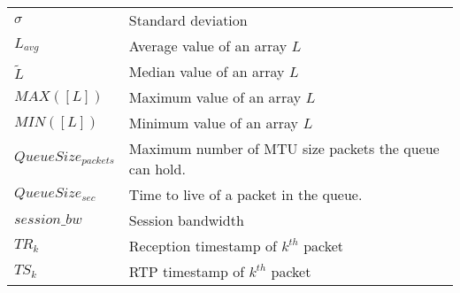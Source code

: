 \begin{longtable}{ll}
$\sigma$	& 	Standard deviation \\
$L_{avg}$   & Average value of an array $L$ \\
$\widetilde{L}$ & Median value of an array $L$ \\
$MAX([L])$ 	& Maximum value of an array $L$ \\
$MIN([L])$ 	& Minimum value of an array $L$ \\
$QueueSize_{packets}$ & Maximum number of MTU size packets the queue can hold.\\
$QueueSize_{sec}$ & Time to live of a packet in the queue.\\
$session\_bw$	& Session bandwidth \\
$TR_k$ 		& 	Reception timestamp of $k^{th}$ packet \\
$TS_k$ 		& 	RTP timestamp of $k^{th}$ packet \\

\end{longtable}
